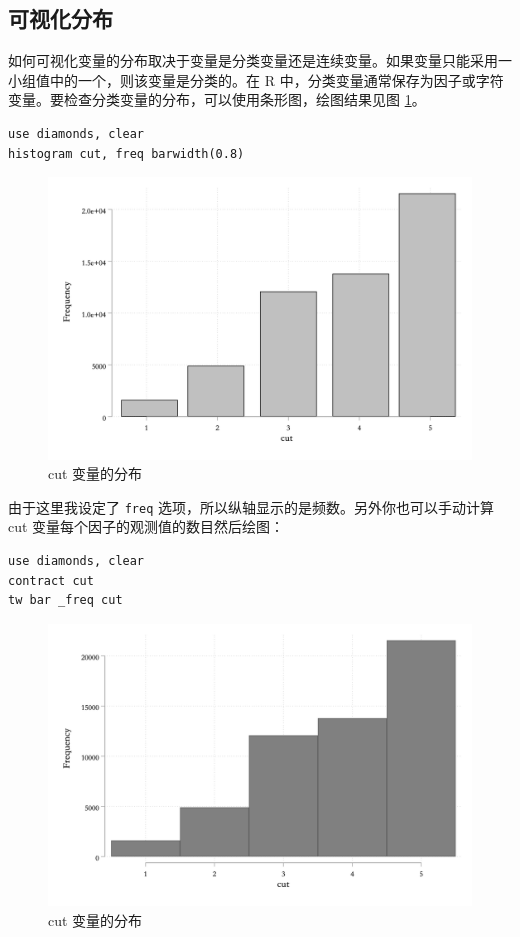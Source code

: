 \subsection{可视化分布}

如何可视化变量的分布取决于变量是分类变量还是连续变量。如果变量只能采用一小组值中的一个，则该变量是分类的。在 R 中，分类变量通常保存为因子或字符变量。要检查分类变量的分布，可以使用条形图，绘图结果见图 \ref{fig:histogramcut}。

\begin{lstlisting}
use diamonds, clear
histogram cut, freq barwidth(0.8)
\end{lstlisting}

\begin{figure}[htbp]
  \centering
  \includegraphics[width=\textwidth]{assets/histogramcut.png}
  \caption{cut 变量的分布}
  \label{fig:histogramcut}
\end{figure}

由于这里我设定了 \texttt{freq} 选项，所以纵轴显示的是频数。另外你也可以手动计算 cut 变量每个因子的观测值的数目然后绘图：

\begin{lstlisting}
use diamonds, clear
contract cut
tw bar _freq cut
\end{lstlisting}

\begin{figure}[htbp]
  \centering
  \includegraphics[width=\textwidth]{assets/histogramcut2.png}
  \caption{cut 变量的分布}
  \label{fig:histogramcut2}
\end{figure}

